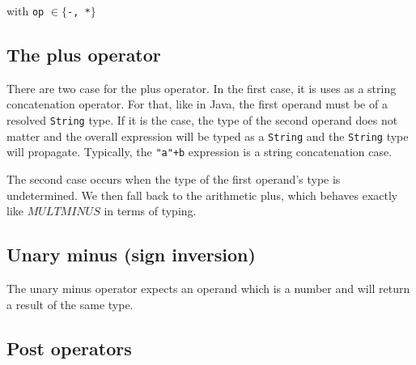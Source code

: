 \documentclass[11pt]{report}
\begin{document}
\begin{center}
 
\DP
\end{center}
\begin{center}with  \texttt{op} $\in \{$\texttt{-, *}$\}$\end{center}


\subsection{The plus operator}

There are two case for the plus operator. In the first case, it is uses as a string concatenation operator. For that, like in Java, the first operand must be of a resolved \texttt{String} type. If it is the case, the type of the second operand does not matter and the overall expression will be typed as a \texttt{String} and the \texttt{String} type will propagate. Typically, the \texttt{"a"+b} expression is a string concatenation case.

\begin{center}
 
\DP
\end{center}

The second case occurs when the type of the first operand's type is undetermined. We then fall back to the arithmetic plus, which behaves exactly like $MULTMINUS$ in terms of typing.

\begin{center}
 
\DP
\end{center}

\subsection{Unary minus (sign inversion)}

The unary minus operator expects an operand which is a number and will return a result of the same type.

\begin{center}
\DP
\end{center}

\subsection{Post operators}
\end{document}
